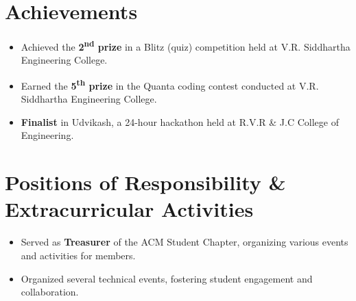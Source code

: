 \documentclass{article}
\begin{document}
\section*{Achievements}
\vspace{-3mm}
\begin{itemize}[leftmargin=*,itemsep = 0.4mm]
    \item Achieved the \textbf{2\textsuperscript{nd} prize} in a Blitz (quiz) competition held at V.R. Siddhartha Engineering College.
    \item Earned the \textbf{5\textsuperscript{th} prize} in the Quanta coding contest conducted at V.R. Siddhartha Engineering College.
    \item \textbf{Finalist} in Udvikash, a 24-hour hackathon held at R.V.R \& J.C College of Engineering.
\end{itemize}
\vspace{-8mm}
\section*{Positions of Responsibility \& Extracurricular Activities}
\vspace{-3mm}
\begin{itemize}[leftmargin=*,itemsep = 0.4mm]
    \item Served as \textbf{Treasurer} of the ACM Student Chapter, organizing various events and activities for members.
    \item Organized several technical events, fostering student engagement and collaboration.
\end{itemize}
\end{document}
